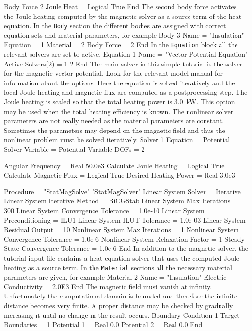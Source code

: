 Body Force 2
  Joule Heat = Logical True
End
\ttend
%
The second body force activates the Joule heating computed by the
magnetic solver as a source term of the heat equation.
%
In the \texttt{Body} section the different bodies are assigned 
with correct equation sets and material parameters, for example
\ttbegin
Body 3
  Name = "Insulation"
  Equation = 1
  Material = 2
  Body Force = 2
End
\ttend
%
In the \texttt{Equation} block all the relevant solvers are 
set to active.
\ttbegin
Equation 1
  Name = "Vector Potential Equation"
  Active Solvers(2) = 1 2
End
\ttend
%
The main solver in this simple tutorial is the solver for the magnetic
vector potential. Look for the relevant model manual for information
about the options. Here the equation is solved iteratively and the
local Joule heating and magnetic flux are computed as a postprocessing
step. The Joule heating is scaled so that the total heating power is
3.0~kW. This option may be used when the total heating efficiency is
known.  The nonlinear solver parameters are not really needed as the
material parameters are constant. Sometimes the parameters may depend
on the magnetic field and thus the nonlinear problem must be solved
iteratively.
%
\ttbegin
Solver 1
  Equation = Potential Solver
  Variable = Potential
  Variable DOFs = 2

  Angular Frequency = Real 50.0e3
  Calculate Joule Heating = Logical True
  Calculate Magnetic Flux = Logical True
  Desired Heating Power = Real 3.0e3

  Procedure = "StatMagSolve" "StatMagSolver"
  Linear System Solver = Iterative
  Linear System Iterative Method = BiCGStab
  Linear System Max Iterations = 300
  Linear System Convergence Tolerance = 1.0e-10
  Linear System Preconditioning = ILU1
  Linear System ILUT Tolerance = 1.0e-03
  Linear System Residual Output = 10
  Nonlinear System Max Iterations = 1
  Nonlinear System Convergence Tolerance = 1.0e-6
  Nonlinear System Relaxation Factor = 1
  Steady State Convergence Tolerance = 1.0e-6
End
\ttend
%
In addition to the magnetic solver, the tutorial input file contains a
heat equation solver that uses the computed Joule heating as a source
term.
%
In the \texttt{Material} sections all the necessary 
material parameters are given, for example
\ttbegin
Material 2
  Name = "Insulation"
  Electric Conductivity = 2.0E3
End
\ttend
%
The magnetic field must vanish at infinity. Unfortunately the
computational domain is bounded and therefore the infinite
distance becomes very finite. A proper distance may be checked
by gradually increasing it until no change in the result occurs.
%
\ttbegin
Boundary Condition 1
  Target Boundaries = 1
  Potential 1 = Real 0.0
  Potential 2 = Real 0.0
End
\ttend

